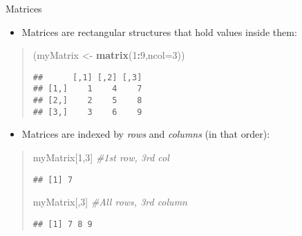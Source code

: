 \documentclass[
  ignorenonframetext,
  aspectratio=169]{beamer}
\newenvironment{Shaded}{\begin{snugshade}}{\end{snugshade}}
\newcommand{\AttributeTok}[1]{\textcolor[rgb]{0.13,0.29,0.53}{#1}}
\newcommand{\CommentTok}[1]{\textcolor[rgb]{0.56,0.35,0.01}{\textit{#1}}}
\newcommand{\DecValTok}[1]{\textcolor[rgb]{0.00,0.00,0.81}{#1}}
\newcommand{\FunctionTok}[1]{\textcolor[rgb]{0.13,0.29,0.53}{\textbf{#1}}}
\newcommand{\NormalTok}[1]{#1}
\newcommand{\OtherTok}[1]{\textcolor[rgb]{0.56,0.35,0.01}{#1}}
\newcommand{\SpecialCharTok}[1]{\textcolor[rgb]{0.81,0.36,0.00}{\textbf{#1}}}
\providecommand{\tightlist}{%
  \setlength{\itemsep}{0pt}\setlength{\parskip}{0pt}}
\begin{document}
\begin{frame}[fragile]{Matrices}
\protect\hypertarget{matrices}{}
\begin{itemize}
\tightlist
\item
  Matrices are rectangular structures that hold values inside them:
\end{itemize}

\footnotesize

\begin{quote}
\begin{Shaded}
\begin{Highlighting}[]
\NormalTok{(myMatrix }\OtherTok{\textless{}{-}} \FunctionTok{matrix}\NormalTok{(}\DecValTok{1}\SpecialCharTok{:}\DecValTok{9}\NormalTok{,}\AttributeTok{ncol=}\DecValTok{3}\NormalTok{))}
\end{Highlighting}
\end{Shaded}

\begin{verbatim}
##      [,1] [,2] [,3]
## [1,]    1    4    7
## [2,]    2    5    8
## [3,]    3    6    9
\end{verbatim}
\end{quote}

\normalsize

\begin{itemize}
\tightlist
\item
  Matrices are indexed by \emph{rows} and \emph{columns} (in that
  order):
\end{itemize}

\footnotesize

\begin{quote}
\begin{Shaded}
\begin{Highlighting}[]
\NormalTok{myMatrix[}\DecValTok{1}\NormalTok{,}\DecValTok{3}\NormalTok{] }\CommentTok{\#1st row, 3rd col}
\end{Highlighting}
\end{Shaded}

\begin{verbatim}
## [1] 7
\end{verbatim}

\begin{Shaded}
\begin{Highlighting}[]
\NormalTok{myMatrix[,}\DecValTok{3}\NormalTok{] }\CommentTok{\#All rows, 3rd column}
\end{Highlighting}
\end{Shaded}

\begin{verbatim}
## [1] 7 8 9
\end{verbatim}
\end{quote}

\normalsize
\end{frame}
\end{document}
